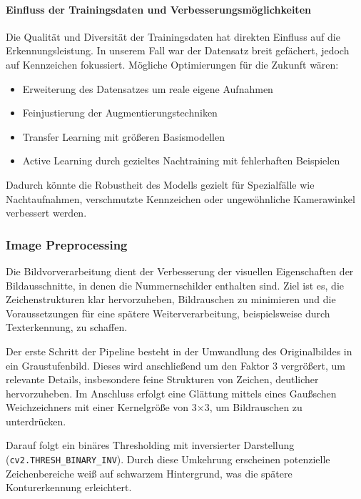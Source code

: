 \paragraph{Einfluss der Trainingsdaten und Verbesserungsmöglichkeiten}
Die Qualität und Diversität der Trainingsdaten hat direkten Einfluss auf die Erkennungsleistung. In unserem Fall war der Datensatz breit gefächert, jedoch auf Kennzeichen fokussiert. Mögliche Optimierungen für die Zukunft wären:

\begin{itemize}
    \item Erweiterung des Datensatzes um reale eigene Aufnahmen
    \item Feinjustierung der Augmentierungstechniken
    \item Transfer Learning mit größeren Basismodellen
    \item Active Learning durch gezieltes Nachtraining mit fehlerhaften Beispielen
  \end{itemize}

  Dadurch könnte die Robustheit des Modells gezielt für Spezialfälle wie Nachtaufnahmen, verschmutzte Kennzeichen oder ungewöhnliche Kamerawinkel verbessert werden.


\subsubsection{Image Preprocessing}

Die Bildvorverarbeitung dient der Verbesserung der visuellen Eigenschaften der Bildausschnitte, in denen die Nummernschilder enthalten sind. Ziel ist es, die Zeichenstrukturen klar hervorzuheben, Bildrauschen zu minimieren und die Voraussetzungen für eine spätere Weiterverarbeitung, beispielsweise durch Texterkennung, zu schaffen.\singlespacing

Der erste Schritt der Pipeline besteht in der Umwandlung des Originalbildes in ein Graustufenbild. Dieses wird anschließend um den Faktor 3 vergrößert, um relevante Details, insbesondere feine Strukturen von Zeichen, deutlicher hervorzuheben. Im Anschluss erfolgt eine Glättung mittels eines Gaußschen Weichzeichners mit einer Kernelgröße von 3$\times$3, um Bildrauschen zu unterdrücken.

Darauf folgt ein binäres Thresholding mit inversierter Darstellung (\texttt{cv2.THRESH\_BINARY\_INV}). Durch diese Umkehrung erscheinen potenzielle Zeichenbereiche weiß auf schwarzem Hintergrund, was die spätere Konturerkennung erleichtert.\singlespacing

